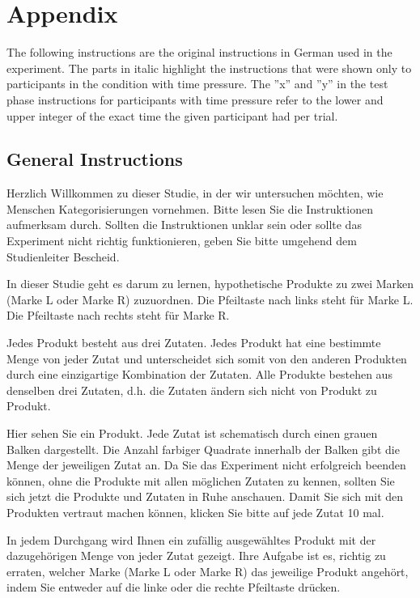 \documentclass[a4paper,man,natbib]{apa6}
\begin{document}
\newpage
\section{Appendix}
The following instructions are the original instructions in German used in the experiment. The parts in italic highlight the instructions that were shown only to participants in the condition with time pressure. The ''x'' and ''y'' in the test phase instructions for participants with time pressure refer to the lower and upper integer of the exact time the given participant had per trial.

\subsection{General Instructions}
Herzlich Willkommen zu dieser Studie, in der wir untersuchen möchten, wie Menschen Kategorisierungen vornehmen.
Bitte lesen Sie die Instruktionen aufmerksam durch. Sollten die Instruktionen unklar sein oder sollte das Experiment nicht richtig funktionieren, geben Sie bitte umgehend dem Studienleiter Bescheid.

In dieser Studie geht es darum zu lernen, hypothetische Produkte zu zwei Marken (Marke L oder Marke R) zuzuordnen.
Die Pfeiltaste nach links steht für Marke L. Die Pfeiltaste nach rechts steht für Marke R.

Jedes Produkt besteht aus drei Zutaten. Jedes Produkt hat eine bestimmte Menge von jeder Zutat und unterscheidet sich somit von den anderen Produkten durch eine einzigartige Kombination der Zutaten.
Alle Produkte bestehen aus denselben drei Zutaten, d.h. die Zutaten ändern sich nicht von Produkt zu Produkt.

Hier sehen Sie ein Produkt. Jede Zutat ist schematisch durch einen grauen Balken dargestellt. Die Anzahl farbiger Quadrate innerhalb der Balken gibt die Menge der jeweiligen Zutat an.
Da Sie das Experiment nicht erfolgreich beenden können, ohne die Produkte mit allen möglichen Zutaten zu kennen, sollten Sie sich jetzt die Produkte und Zutaten in Ruhe anschauen.
Damit Sie sich mit den Produkten vertraut machen können, klicken Sie bitte auf jede Zutat 10 mal.

In jedem Durchgang wird Ihnen ein zufällig ausgewähltes Produkt mit der dazugehörigen Menge von jeder Zutat gezeigt. Ihre Aufgabe ist es, richtig zu erraten, welcher Marke (Marke L oder Marke R) das jeweilige Produkt angehört, indem Sie entweder auf die linke oder die rechte Pfeiltaste drücken.
\end{document}
